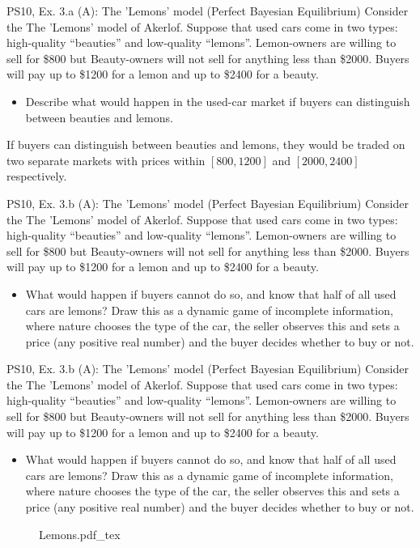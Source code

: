 \begin{frame}{PS10, Ex. 3.a (A): The 'Lemons' model (Perfect Bayesian Equilibrium)}
    Consider the The 'Lemons' model of Akerlof. Suppose that used cars come in two types: high-quality “beauties” and low-quality “lemons”. Lemon-owners are willing to sell for \$800 but Beauty-owners will not sell for anything less than \$2000. Buyers will pay up to \$1200 for a lemon and up to \$2400 for a beauty.
    \begin{itemize}
      \item[(a)] Describe what would happen in the used-car market if buyers can distinguish between beauties and lemons.
    \end{itemize}
    If buyers can distinguish between beauties and lemons, they would be traded on two separate markets with prices within $[800,1200]$ and $[2000,2400]$ respectively.
    \vfill\null
\end{frame}

\begin{frame}{PS10, Ex. 3.b (A): The 'Lemons' model (Perfect Bayesian Equilibrium)}
    Consider the The 'Lemons' model of Akerlof. Suppose that used cars come in two types: high-quality “beauties” and low-quality “lemons”. Lemon-owners are willing to sell for \$800 but Beauty-owners will not sell for anything less than \$2000. Buyers will pay up to \$1200 for a lemon and up to \$2400 for a beauty.
    \vspace{-4pt}
    \begin{itemize}
      \item[(b)] What would happen if buyers cannot do so, and know that half of all used cars are lemons? Draw this as a dynamic game of incomplete information, where nature chooses the type of the car, the seller observes this and sets a price (any positive real number) and the buyer decides whether to buy or not.
    \end{itemize}
    \vfill\null
\end{frame}
\begin{frame}{PS10, Ex. 3.b (A): The 'Lemons' model (Perfect Bayesian Equilibrium)}
    Consider the The 'Lemons' model of Akerlof. Suppose that used cars come in two types: high-quality “beauties” and low-quality “lemons”. Lemon-owners are willing to sell for \$800 but Beauty-owners will not sell for anything less than \$2000. Buyers will pay up to \$1200 for a lemon and up to \$2400 for a beauty.
    \vspace{-4pt}
    \begin{itemize}
      \item[(b)] What would happen if buyers cannot do so, and know that half of all used cars are lemons? Draw this as a dynamic game of incomplete information, where nature chooses the type of the car, the seller observes this and sets a price (any positive real number) and the buyer decides whether to buy or not.
    \end{itemize}
    \begin{figure}[!h]
      \center {}
      {Lemons.pdf_tex}
    \end{figure}
    \vfill\null
\end{frame}


